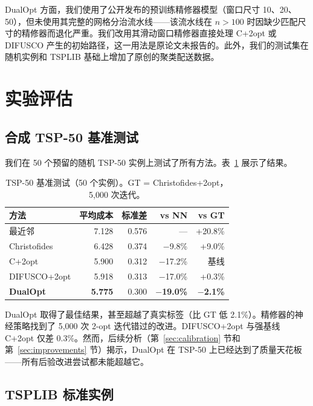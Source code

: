 \documentclass[11pt,a4paper]{ctexart}
\begin{document}
DualOpt 方面，我们使用了公开发布的预训练精修器模型（窗口尺寸 10、20、50），但未使用其完整的网格分治流水线——该流水线在 $n>100$ 时因缺少匹配尺寸的精修器而退化严重。我们改用其滑动窗口精修器直接处理 C+2opt 或 DIFUSCO 产生的初始路径，这一用法是原论文未报告的。此外，我们的测试集在随机实例和 TSPLIB 基础上增加了原创的聚类配送数据。

\section{实验评估}

\subsection{合成 TSP-50 基准测试}

我们在 50 个预留的随机 TSP-50 实例上测试了所有方法。表~\ref{tab:tsp50} 展示了结果。

\begin{table}[H]
\centering
\small
\caption{TSP-50 基准测试（50 个实例）。GT = Christofides+2opt，5,000 次迭代。}
\label{tab:tsp50}
\begin{tabular}{@{}lrrrr@{}}
\toprule
方法 & 平均成本 & 标准差 & vs NN & vs GT \\
\midrule
最近邻 & 7.128 & 0.576 & --- & +20.8\% \\
Christofides & 6.428 & 0.374 & $-$9.8\% & +9.0\% \\
C+2opt & 5.900 & 0.312 & $-$17.2\% & 基线 \\
DIFUSCO+2opt & 5.918 & 0.313 & $-$17.0\% & +0.3\% \\
\textbf{DualOpt} & \textbf{5.775} & 0.300 & \textbf{$-$19.0\%} & \textbf{$-$2.1\%} \\
\bottomrule
\end{tabular}
\end{table}

DualOpt 取得了最佳结果，甚至超越了真实标签（比 GT 低 2.1\%）。精修器的神经策略找到了 5,000 次 2-opt 迭代错过的改进。DIFUSCO+2opt 与强基线 C+2opt 仅差 0.3\%。然而，后续分析（第~\ref{sec:calibration} 节和第~\ref{sec:improvements} 节）揭示，DualOpt 在 TSP-50 上已经达到了质量天花板——所有后验改进尝试都未能超越它。

\subsection{TSPLIB 标准实例}
\end{document}
